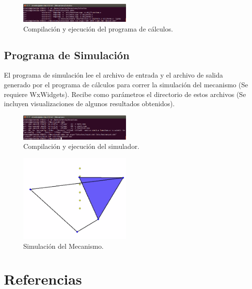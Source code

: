 \documentclass[10pt,journal,compsoc]{styles/IEEEtran}
\begin{document}
   \begin{figure}[H]
    \centering
    \includegraphics[width = 0.5\textwidth]{screen1.png}
    \caption{Compilaci\'on y ejecuci\'on del programa de c\'alculos.}
  \end{figure}

\subsection{Programa de Simulaci\'on}
El programa de simulación lee el archivo de entrada y el archivo de salida generado por el programa de cálculos para correr la simulación del mecanismo (Se requiere WxWidgets). Recibe como parámetros el directorio de estos archivos (Se incluyen visualizaciones de algunos resultados obtenidos).

   \begin{figure}[H]
    \centering
    \includegraphics[width = 0.5\textwidth]{screen2.png}
    \caption{Compilaci\'on y ejecuci\'on del simulador.}
  \end{figure}

   \begin{figure}[H]
    \centering
    \includegraphics[width = 0.5\textwidth]{simulacion.png}
    \caption{Simulaci\'on del Mecanismo.}
  \end{figure}
  
\section{Referencias}



\end{document}
